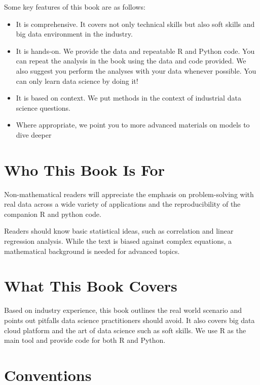 \documentclass[12pt,]{krantz}
\begin{document}
Some key features of this book are as follows:

\begin{itemize}
\item
  It is comprehensive. It covers not only technical skills but also soft skills and big data environment in the industry.
\item
  It is hands-on. We provide the data and repeatable R and Python code. You can repeat the analysis in the book using the data and code provided. We also suggest you perform the analyses with your data whenever possible. You can only learn data science by doing it!
\item
  It is based on context. We put methods in the context of industrial data science questions.
\item
  Where appropriate, we point you to more advanced materials on models to dive deeper
\end{itemize}

\hypertarget{who-this-book-is-for}{%
\section*{Who This Book Is For}\label{who-this-book-is-for}}


Non-mathematical readers will appreciate the emphasis on problem-solving with real data across a wide variety of applications and the reproducibility of the companion R and python code.

Readers should know basic statistical ideas, such as correlation and linear regression analysis. While the text is biased against complex equations, a mathematical background is needed for advanced topics.

\hypertarget{what-this-book-covers}{%
\section*{What This Book Covers}\label{what-this-book-covers}}


Based on industry experience, this book outlines the real world scenario and points out pitfalls data science practitioners should avoid. It also covers big data cloud platform and the art of data science such as soft skills. We use R as the main tool and provide code for both R and Python.

\hypertarget{conventions}{%
\section*{Conventions}\label{conventions}}
\end{document}
